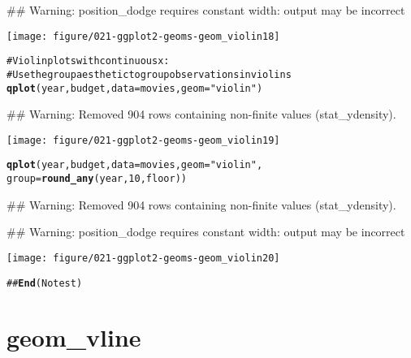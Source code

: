 \documentclass[a4paper,titlepage]{tufte-handout}\usepackage{graphicx, color}
\makeatletter
\def\maxwidth{ %
  \ifdim\Gin@nat@width>\linewidth
    \linewidth
  \else
    \Gin@nat@width
  \fi
}
\newcommand{\hlfunctioncall}[1]{\textcolor[rgb]{0.501960784313725,0,0.329411764705882}{\textbf{#1}}}%
\newcommand{\hlstring}[1]{\textcolor[rgb]{0.6,0.6,1}{#1}}%
\newcommand{\hlcomment}[1]{\textcolor[rgb]{0.180392156862745,0.6,0.341176470588235}{#1}}%
\newenvironment{kframe}{%
 \def\at@end@of@kframe{}%
 \ifinner\ifhmode%
  \def\at@end@of@kframe{\end{minipage}}%
  \begin{minipage}{\columnwidth}%
 \fi\fi%
 \def\FrameCommand##1{\hskip\@totalleftmargin \hskip-\fboxsep
 \colorbox{shadecolor}{##1}\hskip-\fboxsep
     \hskip-\linewidth \hskip-\@totalleftmargin \hskip\columnwidth}%
 \MakeFramed {\advance\hsize-\width
   \@totalleftmargin\z@ \linewidth\hsize
   \@setminipage}}%
 {\par\unskip\endMakeFramed%
 \at@end@of@kframe}
\newenvironment{knitrout}{}{} %
\makeatother
\begin{document}
\begin{knitrout}
\begin{kframe}
{\ttfamily\noindent\textcolor{warningcolor}{\#\# Warning: position\_dodge requires constant width: output may be incorrect}}\end{kframe}\texttt{[image: figure/021-ggplot2-geoms-geom\_violin18]} \begin{kframe}\begin{alltt}
\hlcomment{# Violin plots with continuous x:}
\hlcomment{# Use the group aesthetic to group observations in violins}
\hlfunctioncall{qplot}(year, budget, data = movies, geom = \hlstring{"violin"})
\end{alltt}


{\ttfamily\noindent\textcolor{warningcolor}{\#\# Warning: Removed 904 rows containing non-finite values (stat\_ydensity).}}\end{kframe}\texttt{[image: figure/021-ggplot2-geoms-geom\_violin19]} \begin{kframe}\begin{alltt}
\hlfunctioncall{qplot}(year, budget, data = movies, geom = \hlstring{"violin"},
  group = \hlfunctioncall{round_any}(year, 10, floor))
\end{alltt}


{\ttfamily\noindent\textcolor{warningcolor}{\#\# Warning: Removed 904 rows containing non-finite values (stat\_ydensity).}}

{\ttfamily\noindent\textcolor{warningcolor}{\#\# Warning: position\_dodge requires constant width: output may be incorrect}}\end{kframe}\texttt{[image: figure/021-ggplot2-geoms-geom\_violin20]} \begin{kframe}\begin{alltt}
\hlcomment{## \hlfunctioncall{End}(No test)}
\end{alltt}
\end{kframe}
\end{knitrout}


\section{geom\_vline}
\end{document}
